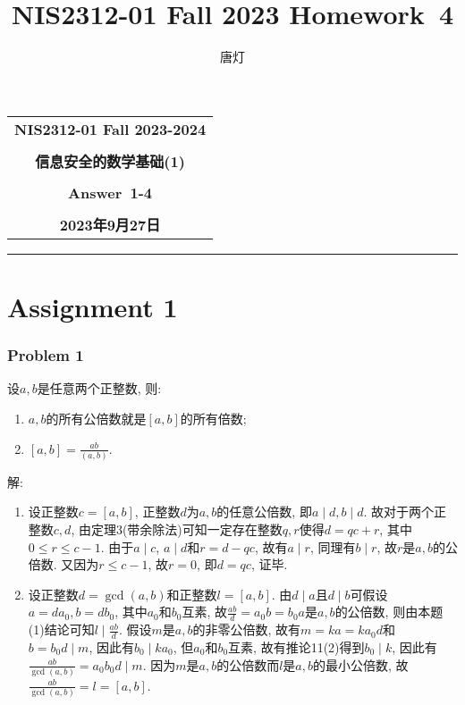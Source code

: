 \documentclass[a4paper,12pt]{ctexart}
\title{NIS2312-01 Fall 2023 Homework~4}
\author{唐灯}
\begin{document}
  \begin{center}

  \vspace{-0.3in}
  \begin{tabular}{c}
    \textbf{\Large NIS2312-01 Fall 2023-2024} \\
    \textbf{\Large  } \\
    \textbf{\Large  信息安全的数学基础(1)} \\
    \textbf{\Large  } \\
    \textbf{\Large  Answer~1-4} \\
    \textbf{\Large  } \\
    \textbf{\Large 2023年9月27日} \\
  \end{tabular}
  \end{center}
  \noindent
  \rule{\linewidth}{0.4pt}

  \section*{Assignment 1}
  \subsubsection*{Problem 1}
  设$a,b$是任意两个正整数, 则: 
  \begin{enumerate}[label=(\arabic{*})]
      \item $a,b$的所有公倍数就是$\left[ a,b \right]$的所有倍数; 
      \item $\left[ a,b \right]=\frac{ab}{(a,b)}$.
  \end{enumerate}
  解: 
  \begin{enumerate}[label=(\arabic{*})]
      \item 设正整数$c=\left[ a,b\right]$, 正整数$d$为$a,b$的任意公倍数, 即$a\mid d,b\mid d$. 故对于两个正整数$c,d$, 由定理3(带余除法)可知一定存在整数$q,r$使得$d=qc+r$, 其中$0\le r\le c-1$. 由于$a\mid c$, $a\mid d$和$r=d-qc$, 故有$a\mid r$, 同理有$b\mid r$, 故$r$是$a,b$的公倍数. 又因为$r\le c-1$, 故$r=0$, 即$d=qc$, 证毕.
      \item  设正整数$d=\gcd(a,b)$和正整数$l=\left[ a,b \right]$. 由$d\mid a$且$d\mid b$可假设 $a=da_0,b=db_0$, 其中$a_0$和$b_0$互素, 故$\frac{ab}{d}=a_0b=b_0a$是$a,b$的公倍数, 则由本题(1)结论可知$l\mid \frac{ab}{d}$. 假设$m$是$a,b$的非零公倍数, 故有$m=ka=ka_0d$和 $b=b_0d\mid m$, 因此有$b_0\mid ka_0$, 但$a_0$和$b_0$互素, 故有推论11(2)得到$b_0\mid k$, 因此有$\frac{ab}{\gcd(a,b)}=a_0b_0d\mid m$. 因为$m$是$a,b$的公倍数而$l$是$a,b$的最小公倍数, 故$\frac{ab}{\gcd(a,b)}=l=\left[ a,b \right]$.
  \end{enumerate}
\end{document}
